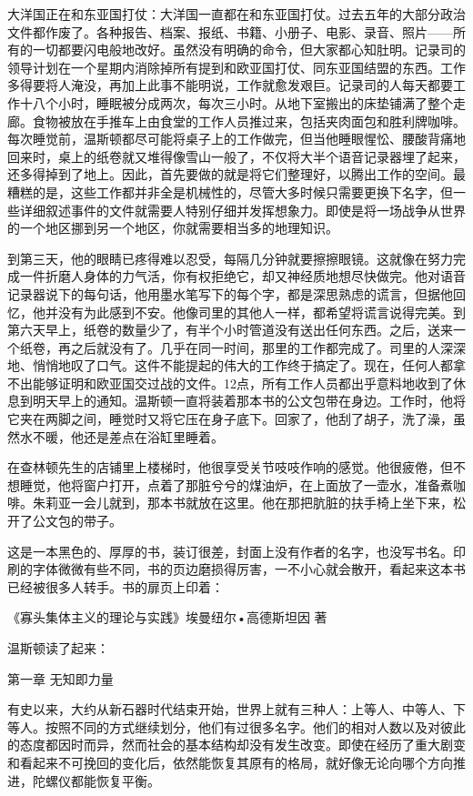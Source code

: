大洋国正在和东亚国打仗：大洋国一直都在和东亚国打仗。过去五年的大部分政治文件都作废了。各种报告、档案、报纸、书籍、小册子、电影、录音、照片——所有的一切都要闪电般地改好。虽然没有明确的命令，但大家都心知肚明。记录司的领导计划在一个星期内消除掉所有提到和欧亚国打仗、同东亚国结盟的东西。工作多得要将人淹没，再加上此事不能明说，工作就愈发艰巨。记录司的人每天都要工作十八个小时，睡眠被分成两次，每次三小时。从地下室搬出的床垫铺满了整个走廊。食物被放在手推车上由食堂的工作人员推过来，包括夹肉面包和胜利牌咖啡。每次睡觉前，温斯顿都尽可能将桌子上的工作做完，但当他睡眼惺忪、腰酸背痛地回来时，桌上的纸卷就又堆得像雪山一般了，不仅将大半个语音记录器埋了起来，还多得掉到了地上。因此，首先要做的就是将它们整理好，以腾出工作的空间。最糟糕的是，这些工作都并非全是机械性的，尽管大多时候只需要更换下名字，但一些详细叙述事件的文件就需要人特别仔细并发挥想象力。即使是将一场战争从世界的一个地区挪到另一个地区，你就需要相当多的地理知识。

到第三天，他的眼睛已疼得难以忍受，每隔几分钟就要擦擦眼镜。这就像在努力完成一件折磨人身体的力气活，你有权拒绝它，却又神经质地想尽快做完。他对语音记录器说下的每句话，他用墨水笔写下的每个字，都是深思熟虑的谎言，但据他回忆，他并没有为此感到不安。他像司里的其他人一样，都希望将谎言说得完美。到第六天早上，纸卷的数量少了，有半个小时管道没有送出任何东西。之后，送来一个纸卷，再之后就没有了。几乎在同一时间，那里的工作都完成了。司里的人深深地、悄悄地叹了口气。这件不能提起的伟大的工作终于搞定了。现在，任何人都拿不出能够证明和欧亚国交过战的文件。12点，所有工作人员都出乎意料地收到了休息到明天早上的通知。温斯顿一直将装着那本书的公文包带在身边。工作时，他将它夹在两脚之间，睡觉时又将它压在身子底下。回家了，他刮了胡子，洗了澡，虽然水不暖，他还是差点在浴缸里睡着。

在查林顿先生的店铺里上楼梯时，他很享受关节吱吱作响的感觉。他很疲倦，但不想睡觉，他将窗户打开，点着了那脏兮兮的煤油炉，在上面放了一壶水，准备煮咖啡。朱莉亚一会儿就到，那本书就放在这里。他在那把肮脏的扶手椅上坐下来，松开了公文包的带子。

这是一本黑色的、厚厚的书，装订很差，封面上没有作者的名字，也没写书名。印刷的字体微微有些不同，书的页边磨损得厉害，一不小心就会散开，看起来这本书已经被很多人转手。书的扉页上印着：

《寡头集体主义的理论与实践》埃曼纽尔•高德斯坦因 著

温斯顿读了起来：

第一章 无知即力量

有史以来，大约从新石器时代结束开始，世界上就有三种人：上等人、中等人、下等人。按照不同的方式继续划分，他们有过很多名字。他们的相对人数以及对彼此的态度都因时而异，然而社会的基本结构却没有发生改变。即使在经历了重大剧变和看起来不可挽回的变化后，依然能恢复其原有的格局，就好像无论向哪个方向推进，陀螺仪都能恢复平衡。


